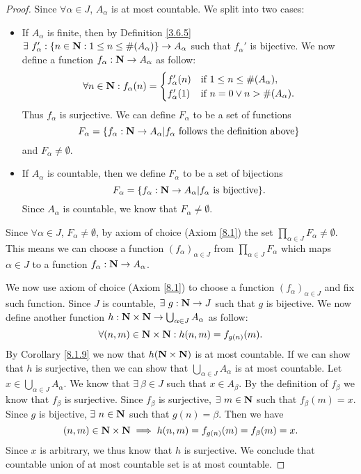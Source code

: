 \begin{proof}
    Since \(\forall \alpha \in J\), \(A_{\alpha}\) is at most countable.
    We split into two cases:
    \begin{itemize}
        \item If \(A_{\alpha}\) is finite, then by Definition \ref{3.6.5} \(\exists\ f_{\alpha}' : \{n \in \N : 1 \leq n \leq \#(A_{\alpha})\} \to A_{\alpha}\) such that \(f_{\alpha}'\) is bijective.
              We now define a function \(f_{\alpha} : \mathbf{N} \to A_{\alpha}\) as follow:
              \[
                  \forall n \in \mathbf{N} : f_{\alpha}(n) = \begin{cases}
                      f_{\alpha}'(n) & \text{if } 1 \leq n \leq \#(A_{\alpha}),  \\
                      f_{\alpha}'(1) & \text{if } n = 0 \lor n > \#(A_{\alpha}).
                  \end{cases}
              \]
              Thus \(f_{\alpha}\) is surjective.
              We can define \(F_{\alpha}\) to be a set of functions
              \[
                  F_{\alpha} = \{f_{\alpha} : \mathbf{N} \to A_{\alpha} | f_{\alpha} \text{ follows the definition above}\}
              \]
              and \(F_{\alpha} \neq \emptyset\).
        \item If \(A_{\alpha}\) is countable, then we define \(F_{\alpha}\) to be a set of bijections
              \[
                  F_{\alpha} = \{f_{\alpha} : \mathbf{N} \to A_{\alpha} | f_{\alpha} \text{ is bijective}\}.
              \]
              Since \(A_{\alpha}\) is countable, we know that \(F_{\alpha} \neq \emptyset\).
    \end{itemize}
    Since \(\forall \alpha \in J\), \(F_{\alpha} \neq \emptyset\), by axiom of choice (Axiom \ref{8.1}) the set \(\prod_{\alpha \in J} F_{\alpha} \neq \emptyset\).
    This means we can choose a function \((f_{\alpha})_{\alpha \in J}\) from \(\prod_{\alpha \in J} F_{\alpha}\) which maps \(\alpha \in J\) to a function \(f_{\alpha} : \mathbf{N} \to A_{\alpha}\).

    We now use axiom of choice (Axiom \ref{8.1}) to choose a function \((f_{\alpha})_{\alpha \in J}\) and fix such function.
    Since \(J\) is countable, \(\exists\ g : \mathbf{N} \to J\) such that \(g\) is bijective.
    We now define another function \(h : \mathbf{N} \times \mathbf{N} \to \bigcup_{\alpha \in J} A_{\alpha}\) as follow:
    \[
        \forall (n, m) \in \mathbf{N} \times \mathbf{N} : h(n, m) = f_{g(n)}(m).
    \]
    By Corollary \ref{8.1.9} we now that \(h(\mathbf{N} \times \mathbf{N})\) is at most countable.
    If we can show that \(h\) is surjective, then we can show that \(\bigcup_{\alpha \in J} A_{\alpha}\) is at most countable.
    Let \(x \in \bigcup_{\alpha \in J} A_{\alpha}\).
    We know that \(\exists\ \beta \in J\) such that \(x \in A_{\beta}\).
    By the definition of \(f_{\beta}\) we know that \(f_{\beta}\) is surjective.
    Since \(f_{\beta}\) is surjective, \(\exists\ m \in \mathbf{N}\) such that \(f_{\beta}(m) = x\).
    Since \(g\) is bijective, \(\exists\ n \in \mathbf{N}\) such that \(g(n) = \beta\).
    Then we have
    \[
        (n, m) \in \mathbf{N} \times \mathbf{N} \implies h(n, m) = f_{g(n)}(m) = f_{\beta}(m) = x.
    \]
    Since \(x\) is arbitrary, we thus know that \(h\) is surjective.
    We conclude that countable union of at most countable set is at most countable.


\end{proof}
